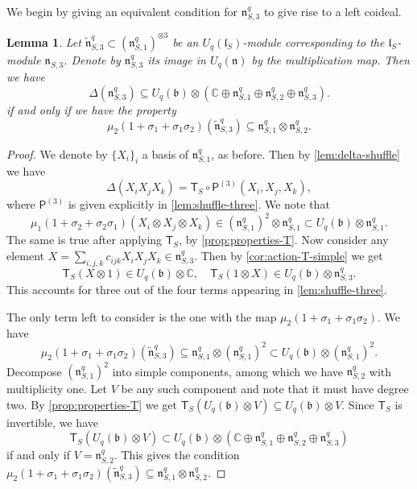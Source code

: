 \documentclass[a4paper, 12pt, reqno, english]{amsart}
\numberwithin{equation}{section}
\numberwithin{figure}{section}
\theoremstyle{plain}
\theoremstyle{plain}
\theoremstyle{plain}
\theoremstyle{plain}
\newtheorem{lemma}[theorem]{Lemma}
\theoremstyle{plain}
\theoremstyle{definition}
\theoremstyle{definition}
\theoremstyle{definition}
\theoremstyle{remark}
\theoremstyle{definition}
\theoremstyle{definition}
\newcommand{\Uqb}{U_q(\mathfrak{b})}
\newcommand{\Uqn}{U_q(\mathfrak{n})}
\newcommand{\UqlS}{U_q(\mathfrak{l}_S)}
\newcommand{\bbC}{\mathbb{C}}
\newcommand{\liel}{\mathfrak{l}}
\newcommand{\lien}{\mathfrak{n}}
\newcommand{\tmapS}{\mathsf{T}_S}
\newcommand{\pmap}{\mathsf{P}}
\newcommand{\qnil}{\lien^q}
\begin{document}
We begin by giving an equivalent condition for $\qnil_{S, 3}$ to give rise to a left coideal.

\begin{lemma}
\label{lem:degree-three-property}
Let $\tilde{\lien}^q_{S, 3} \subset (\qnil_{S, 1})^{\otimes 3}$ be an $\UqlS$-module corresponding to the $\liel_S$-module $\lien_{S, 3}$.
Denote by $\qnil_{S, 3}$ its image in $\Uqn$ by the multiplication map.
Then we have
\[
\Delta(\lien^q_{S, 3}) \subseteq \Uqb \otimes (\bbC \oplus \qnil_{S, 1} \oplus \qnil_{S, 2} \oplus \qnil_{S, 3}).
\]
if and only if we have the property
\[
\mu_2 (1 + \sigma_1 + \sigma_1 \sigma_2) (\tilde{\lien}^q_{S, 3}) \subseteq \qnil_{S, 1} \otimes \qnil_{S, 2}.
\]
\end{lemma}

\begin{proof}
We denote by $\{X_i\}_i$ a basis of $\qnil_{S, 1}$, as before.
Then by \cref{lem:delta-shuffle} we have
\[
\Delta(X_i X_j X_k) = \tmapS \circ \pmap^{(3)} (X_i, X_j, X_k),
\]
where $\pmap^{(3)}$ is given explicitly in \cref{lem:shuffle-three}.
We note that
\[
\mu_1 (1 + \sigma_2 + \sigma_2 \sigma_1) (X_i \otimes X_j \otimes X_k) \in (\qnil_{S, 1})^2 \otimes \qnil_{S, 1} \subset \Uqb \otimes \qnil_{S, 1}.
\]
The same is true after applying $\tmapS$, by \cref{prop:properties-T}.
Now consider any element $X = \sum_{i, j, k} c_{i j k} X_i X_j X_k \in \qnil_{S, 3}$.
Then by \cref{cor:action-T-simple} we get
\[
\tmapS(X \otimes 1) \in \Uqb \otimes \bbC, \quad
\tmapS(1 \otimes X) \in \Uqb \otimes \qnil_{S, 3}.
\]
This accounts for three out of the four terms appearing in \cref{lem:shuffle-three}.

The only term left to consider is the one with the map $\mu_2 (1 + \sigma_1 + \sigma_1 \sigma_2)$. We have
\[
\mu_2 (1 + \sigma_1 + \sigma_1 \sigma_2) (\tilde{\lien}^q_{S, 3}) \subseteq \qnil_{S, 1} \otimes (\qnil_{S, 1})^2 \subset \Uqb \otimes (\qnil_{S, 1})^2.
\]
Decompose $(\qnil_{S, 1})^2$ into simple components, among which we have $\qnil_{S, 2}$ with multiplicity one.
Let $V$ be any such component and note that it must have degree two.
By \cref{prop:properties-T} we get $\tmapS(\Uqb \otimes V) \subseteq \Uqb \otimes V$.
Since $\tmapS$ is invertible, we have
\[
\tmapS(\Uqb \otimes V) \subset \Uqb \otimes (\bbC \oplus \qnil_{S, 1} \oplus \qnil_{S, 2} \oplus \qnil_{S, 3})
\]
if and only if $V = \qnil_{S, 2}$.
This gives the condition $\mu_2 (1 + \sigma_1 + \sigma_1 \sigma_2) (\tilde{\lien}^q_{S, 3}) \subseteq \qnil_{S, 1} \otimes \qnil_{S, 2}.$
\end{proof}
\end{document}
